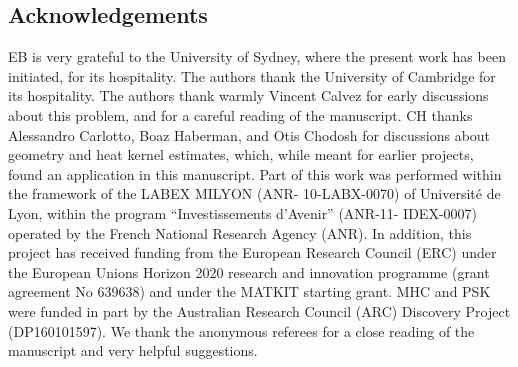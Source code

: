 \documentclass[11pt]{article}    %
\newtheorem{remark}[theorem]{Remark}
\begin{document}
%
%
%

















\subsection*{Acknowledgements}

EB is very grateful to the University of Sydney, where the present work has been initiated, for its hospitality.  The authors thank the University of Cambridge for its hospitality.  The authors thank warmly Vincent Calvez for early discussions about this problem, and for a careful reading of the manuscript.  CH thanks Alessandro Carlotto, Boaz Haberman, and Otis Chodosh for discussions about geometry and heat kernel estimates, which, while meant for earlier projects, found an application in this manuscript. Part of this work was performed within the framework of the LABEX MILYON (ANR- 10-LABX-0070) of Universit\'e de Lyon, within the program ``Investissements d'Avenir'' (ANR-11- IDEX-0007) operated by the French National Research Agency (ANR). In addition, this project has received funding from the European Research Council (ERC) under the European Unions Horizon 2020 research and innovation programme (grant agreement No 639638) and under the MATKIT starting grant. MHC and PSK were funded in part by the Australian Research Council (ARC) Discovery Project (DP160101597). We thank the anonymous referees for a close reading of the manuscript and very helpful suggestions.
\end{document}
